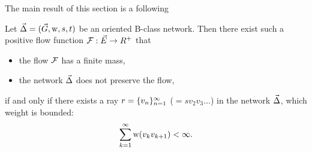 \documentclass[12pt]{article}
\begin{document}
    The main result of this section is a following
    \begin{theorem}
      \label{ray-thm}
      Let $\vec{\Delta} = (\vec{G}, \mathrm{w}, s, t)$ be an oriented B-class network.
      Then there exist such a positive flow function $\mathcal{F}: \vec{E} \to R^{+}$ that
      \begin{itemize}
        \item the flow $\mathcal{F}$ has a finite mass,
        \item the network $\vec{\Delta}$ does not preserve the flow,
      \end{itemize}
        if and only if there exists a ray $r = \{{v}_n\}_{n=1}^\infty$ ($=sv_2v_3\dots$)
        in the network $\vec{\Delta}$, which weight is bounded:
        $$
          \sum_{k=1}^\infty \mathrm{w}(v_k v_{k+1}) < \infty.
        $$
    \end{theorem}
\end{document}
